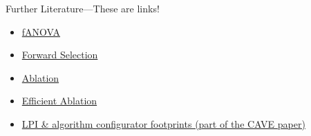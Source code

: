 \begin{frame}[c]{Further Literature---These are links!}

\begin{itemize}
    \item \href{http://aad.informatik.uni-freiburg.de/papers/14-ICML-HyperparameterAssessment-longversion.pdf}{fANOVA}
    \item \href{http://aad.informatik.uni-freiburg.de/papers/13-LION-FeatureAndParameterImportance.pdf}{Forward Selection}
    \item \href{http://www.cs.ubc.ca/~hoos/Publ/FawHoo13.pdf}{Ablation}
    \item \href{https://ml.informatik.uni-freiburg.de/papers/17-AAAI-Surrogate-Ablation.pdf}{Efficient Ablation}
    \item \href{https://ml.informatik.uni-freiburg.de/papers/18-LION12-CAVE.pdf}{LPI \& algorithm configurator footprints (part of the CAVE paper)}
\end{itemize}


\end{frame}
